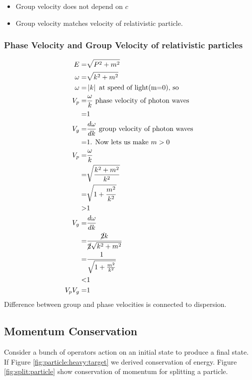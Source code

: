 \documentclass[]{article}
\begin{document}
\begin{itemize}
	\item Group velocity does not depend on $c$
	\item Group velocity matches velocity of relativistic particle.
\end{itemize}

\subsubsection{Phase Velocity and Group Velocity of relativistic particles}

\begin{align*}
E =& \sqrt{P^2 + m^2}\\
\omega =& \sqrt{k^2 + m^2}\\
\omega =& \left| k \right| \text{ at speed of light(m=0), so}\\
V_p =& \frac{\omega}{k} \text{ phase velocity of photon waves}\\
 =&1\\
 V_g =& \frac{d\omega}{dk} \text{ group velocity of photon waves}\\
 =&1 \text{. Now lets us make $m>0$}\\
 V_p =& \frac{\omega}{k}\\
 =&\sqrt{\frac{k^2+m^2}{k^2}}\\
 =&\sqrt{1+\frac{m^2}{k^2}}\\
 >&1 \\
 V_g =& \frac{d\omega}{dk} \\
 =& \frac{\cancel{2}k}{\cancel{2}\sqrt{k^2+m^2}}\\
 =& \frac{1}{\sqrt{1+\frac{m^2}{k^2}}}\\
 <&1\\
 V_p V_g =& 1
\end{align*}
Difference between group and phase velocities is connected to dispersion.

\subsection{Momentum Conservation}\label{sec:momentum:conservation}

Consider a bunch of operators action on an initial state to produce a final state. If Figure \ref{fig:particle:heavy:target} we derived conservation of energy. Figure \ref{fig:split:particle} show conservation of momentum for splitting a particle. 
 
\end{document}
